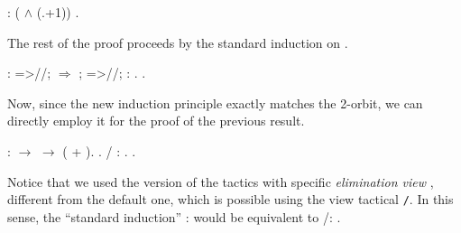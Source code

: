 \begin{coqdoccode}
\coqdocemptyline
\coqdocnoindent
{}: (  \ensuremath{\land}  (.+1))  .\coqdoceol
\coqdocemptyline
\end{coqdoccode}


The rest of the proof proceeds by the standard induction on .


\begin{coqdoccode}
\coqdocemptyline
\coqdocnoindent
{} : =>//; \ensuremath{\Rightarrow}  ; =>//;   : .\coqdoceol
\coqdocnoindent
{}.\coqdoceol
\coqdocemptyline
\end{coqdoccode}


Now, since the new induction principle  exactly matches the
2-orbit, we can directly employ it for the proof of the previous result.


\begin{coqdoccode}
\coqdocemptyline
\coqdocnoindent
{}    :   \ensuremath{\rightarrow}   \ensuremath{\rightarrow}  ( + ).\coqdoceol
\coqdocnoindent
{}.\coqdoceol
\coqdocnoindent
{} / : .\coqdoceol
\coqdocnoindent
{}.\coqdoceol
\coqdocemptyline
\end{coqdoccode}


Notice that we used the version of the  tactics with specific
\textit{elimination view} , different from the default one, which
is possible using the view tactical \texttt{/}\ssrtl{/}.
 In this sense, the ``standard induction''
:  would be equivalent to /: .


